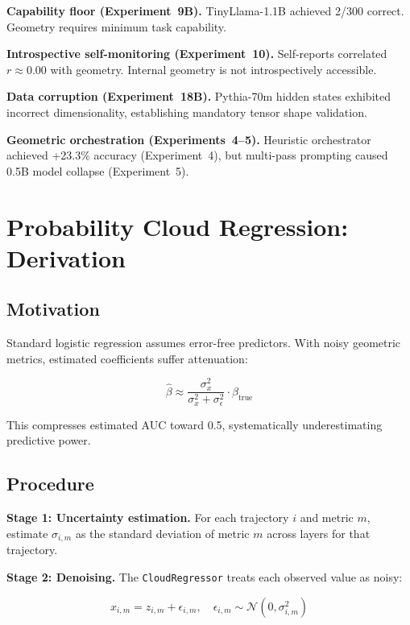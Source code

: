 \documentclass[11pt,twocolumn]{article}
\begin{document}
\textbf{Capability floor (Experiment~9B).} TinyLlama-1.1B achieved 2/300 correct. Geometry requires minimum task capability.

\textbf{Introspective self-monitoring (Experiment~10).} Self-reports correlated $r \approx 0.00$ with geometry. Internal geometry is not introspectively accessible.

\textbf{Data corruption (Experiment~18B).} Pythia-70m hidden states exhibited incorrect dimensionality, establishing mandatory tensor shape validation.

\textbf{Geometric orchestration (Experiments~4--5).} Heuristic orchestrator achieved +23.3\% accuracy (Experiment~4), but multi-pass prompting caused 0.5B model collapse (Experiment~5).


\section{Probability Cloud Regression: Derivation}
\label{app:pcr}

\subsection{Motivation}

Standard logistic regression assumes error-free predictors. With noisy geometric metrics, estimated coefficients suffer attenuation:

\begin{equation}
\hat{\beta} \approx \frac{\sigma_x^2}{\sigma_x^2 + \sigma_\epsilon^2} \cdot \beta_{\text{true}}
\end{equation}

This compresses estimated AUC toward 0.5, systematically underestimating predictive power.

\subsection{Procedure}

\textbf{Stage 1: Uncertainty estimation.} For each trajectory $i$ and metric $m$, estimate $\sigma_{i,m}$ as the standard deviation of metric $m$ across layers for that trajectory.

\textbf{Stage 2: Denoising.} The \texttt{CloudRegressor} treats each observed value as noisy:

\begin{equation}
x_{i,m} = z_{i,m} + \epsilon_{i,m}, \quad \epsilon_{i,m} \sim \mathcal{N}(0, \sigma_{i,m}^2)
\end{equation}
\end{document}
